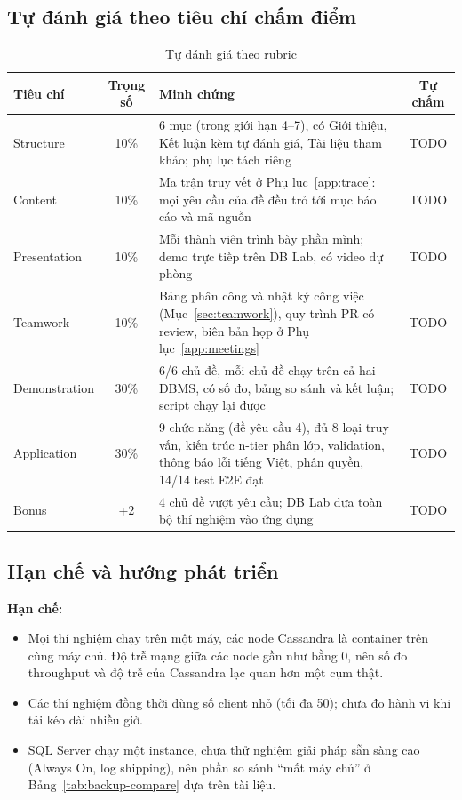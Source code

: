 
\subsection{Tự đánh giá theo tiêu chí chấm điểm}

\begin{table}[H]
\centering
\caption{Tự đánh giá theo rubric}
\label{tab:self-assessment}
\begin{tabularx}{\linewidth}{|p{2.8cm}|c|X|c|}
\hline
\textbf{Tiêu chí} & \textbf{Trọng số} & \textbf{Minh chứng} & \textbf{Tự chấm} \\ \hline
Structure & 10\% & 6 mục (trong giới hạn 4--7), có Giới thiệu, Kết luận kèm tự đánh giá, Tài liệu tham khảo; phụ lục tách riêng & TODO \\ \hline
Content & 10\% & Ma trận truy vết ở Phụ lục~\ref{app:trace}: mọi yêu cầu của đề đều trỏ tới mục báo cáo và mã nguồn & TODO \\ \hline
Presentation & 10\% & Mỗi thành viên trình bày phần mình; demo trực tiếp trên DB Lab, có video dự phòng & TODO \\ \hline
Teamwork & 10\% & Bảng phân công và nhật ký công việc (Mục~\ref{sec:teamwork}), quy trình PR có review, biên bản họp ở Phụ lục~\ref{app:meetings} & TODO \\ \hline
Demonstration & 30\% & 6/6 chủ đề, mỗi chủ đề chạy trên cả hai DBMS, có số đo, bảng so sánh và kết luận; script chạy lại được & TODO \\ \hline
Application & 30\% & 9 chức năng (đề yêu cầu 4), đủ 8 loại truy vấn, kiến trúc n-tier phân lớp, validation, thông báo lỗi tiếng Việt, phân quyền, 14/14 test E2E đạt & TODO \\ \hline
Bonus & +2 & 4 chủ đề vượt yêu cầu; DB Lab đưa toàn bộ thí nghiệm vào ứng dụng & TODO \\ \hline
\end{tabularx}
\end{table}

\subsection{Hạn chế và hướng phát triển}
\textbf{Hạn chế:}
\begin{itemize}
    \item Mọi thí nghiệm chạy trên một máy, các node Cassandra là container trên cùng máy chủ. Độ trễ mạng giữa các node gần như bằng 0, nên số đo throughput và độ trễ của Cassandra lạc quan hơn một cụm thật.
    \item Các thí nghiệm đồng thời dùng số client nhỏ (tối đa 50); chưa đo hành vi khi tải kéo dài nhiều giờ.
    \item SQL Server chạy một instance, chưa thử nghiệm giải pháp sẵn sàng cao (Always On, log shipping), nên phần so sánh ``mất máy chủ'' ở Bảng~\ref{tab:backup-compare} dựa trên tài liệu.
\end{itemize}

